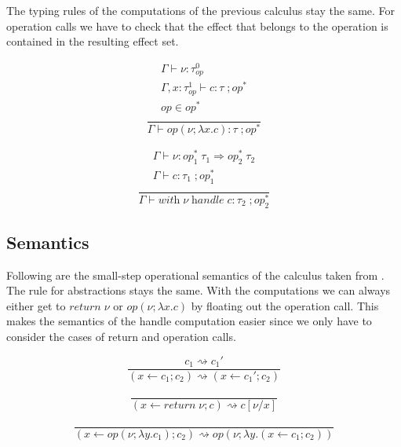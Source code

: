 \documentclass[12pt]{article}
\newcommand\eop[0]{\textit{op}}
\newcommand\eopa[0]{\textit{op}^*}
\newcommand\type[0]{\tau}
\newcommand\thandler[4]{#1 \; #2 \Rightarrow #3 \; #4}
\newcommand\val[0]{\nu}
\newcommand\comp[0]{c}
\newcommand\creturn[1]{\textit{return} \; #1}
\newcommand\cop[4]{#1(#2 ; \lambda #3 . #4)}
\newcommand\cdo[3]{#1 \leftarrow #2 ; #3}
\newcommand\chandle[2]{\textit{with} \; #1 \; \textit{handle} \; #2}
\begin{document}
The typing rules of the computations of the previous calculus stay the same. For operation calls we have to check that the effect that belongs to the operation is contained in the resulting effect set. \\
\begin{minipage}{0.5\textwidth}
\[\frac{
	\begin{array}{l}
	\Gamma \vdash \val : \type^0_\eop \\
	\Gamma , x : \type^1_\eop \vdash \comp : \type \; ; \eopa \\
	\eop \in \eopa \\
	\end{array}
}{
	\Gamma \vdash \cop{\eop}{\val}{x}{\comp} : \type \; ; \eopa
}\]
\end{minipage}
\begin{minipage}{0.5\textwidth}
\[\frac{
	\begin{array}{l}
	\Gamma \vdash \val : \thandler{\eopa_1}{\type_1}{\eopa_2}{\type_2} \\
	\Gamma \vdash \comp : \type_1 \; ; \eopa_1 \\
	\end{array}
}{
	\Gamma \vdash \chandle{\val}{\comp} : \type_2 \; ; \eopa_2
}\]
\end{minipage}

\subsection{Semantics}

Following are the small-step operational semantics of the calculus taken from \cite{pretnar}.
The rule for abstractions stays the same.
With the computations we can always either get to $\creturn{\val}$ or $\cop{\eop}{\val}{x}{\comp}$ by floating out the operation call.
This makes the semantics of the handle computation easier since we only have to consider the cases of return and operation calls.

\begin{minipage}{0.5\textwidth}
\[\frac{
	\comp_1 \rightsquigarrow \comp_1'
}{
	(\cdo{x}{\comp_1}{\comp_2}) \rightsquigarrow (\cdo{x}{\comp_1'}{\comp_2})
}\]
\end{minipage}
\begin{minipage}{0.5\textwidth}
\[\frac{
}{
	(\cdo{x}{\creturn{\val}}{\comp}) \rightsquigarrow \comp[\val / x]
}\]
\end{minipage}
\[\frac{
}{
	(\cdo{x}{\cop{\eop}{\val}{y}{\comp_1}}{\comp_2}) \rightsquigarrow \cop{\eop}{\val}{y}{(\cdo{x}{\comp_1}{\comp_2})}
}\]
\end{document}

